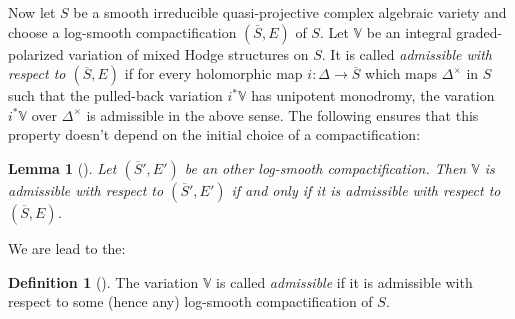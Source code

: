 \documentclass[10pt]{article}
\numberwithin{equation}{subsection}
\theoremstyle{plain}
\newtheorem{lemma}[theorem]{Lemma}
\newtheorem{proposition}[theorem]{Proposition}
\theoremstyle{definition}
\newtheorem{definition}[theorem]{Definition}
\newtheorem{remark}[theorem]{Remark}
\theoremstyle{remark}
\newcommand{\Z}{\mathbb Z}
\newcommand{\V}{\mathbb V}
\newcommand{\an}{\mathrm{an}}
\begin{document}
Now let $S$ be a smooth irreducible quasi-projective complex algebraic variety and choose a log-smooth compactification $(\overline{S},E)$ of $S$. Let $\V$ be an integral graded-polarized variation of mixed Hodge structures on $S$. It is called \textit{admissible with respect to $(\overline{S},E)$} if for every holomorphic map $i : \Delta \rightarrow \overline{S}$ which maps $\Delta^\times$ in $S$ such that the pulled-back variation $i^\ast\V$ has unipotent monodromy, the varation $i^\ast \V$ over $\Delta^\times$ is admissible in the above sense. The following ensures that this property doesn't depend on the initial choice of a compactification:
\begin{lemma}[{\cite[Prop. 4.2]{bbkt}}]
Let $(\overline{S}',E')$ be an other log-smooth compactification. Then $\V$ is admissible with respect to $(\overline{S}',E')$ if and only if it is admissible with respect to $(\overline{S},E)$.
\end{lemma}
We are lead to the:
\begin{definition}[{\cite[Def. 14.49]{petste}}]
The variation $\V$ is called \textit{admissible} if it is admissible with respect to some (hence any) log-smooth compactification of $S$.
\end{definition}
\end{document}
